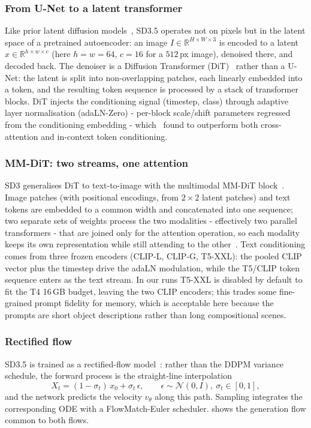 \documentclass[11pt,a4paper]{article}
\begin{document}
\subsubsection*{From U-Net to a latent transformer}
Like prior latent diffusion models~\cite{sdxl}, SD3.5 operates not on pixels but
in the latent space of a pretrained autoencoder: an image
$I\in\mathbb{R}^{H\times W\times 3}$ is encoded to a latent
$x\in\mathbb{R}^{h\times w\times c}$ (here $h=w=64$, $c=16$ for a $512$\,px
image), denoised there, and decoded back. The denoiser is a Diffusion
Transformer (DiT)~\cite{dit} rather than a U-Net: the latent is split into
non-overlapping patches, each linearly embedded into a token, and the resulting
token sequence is processed by a stack of transformer blocks. DiT injects the
conditioning signal (timestep, class) through adaptive layer
normalisation (adaLN-Zero) - per-block scale/shift parameters regressed from
the conditioning embedding - which~\cite{dit} found to outperform both
cross-attention and in-context token conditioning.

\subsubsection*{MM-DiT: two streams, one attention}
SD3 generalises DiT to text-to-image with the multimodal MM-DiT
block~\cite{sd3}. Image patches (with positional encodings, from $2\times2$
latent patches) and text tokens are embedded to a common width and concatenated
into one sequence; two separate sets of weights process the two
modalities - effectively two parallel transformers - that are joined
only for the attention operation, so each modality keeps its own
representation while still attending to the other~\cite{sd3}. Text conditioning
comes from three frozen encoders (CLIP-L, CLIP-G, T5-XXL): the pooled CLIP
vector plus the timestep drive the adaLN modulation, while the T5/CLIP token
sequence enters as the text stream. In our runs T5-XXL is disabled by default to
fit the T4 16\,GB budget, leaving the two CLIP encoders; this trades some
fine-grained prompt fidelity for memory, which is acceptable here because the
prompts are short object descriptions rather than long compositional scenes.

\subsubsection*{Rectified flow}
SD3.5 is trained as a rectified-flow model~\cite{sd3}: rather than the
DDPM variance schedule, the forward process is the straight-line interpolation
\begin{equation}\label{eq:rf}
  X_t = (1-\sigma_t)\,x_0 + \sigma_t\,\epsilon,
  \qquad \epsilon\sim\mathcal{N}(0,I),\ \sigma_t\in[0,1],
\end{equation}
and the network predicts the velocity $v_\theta$ along this path. Sampling
integrates the corresponding ODE with a FlowMatch-Euler scheduler.
 shows the generation flow common to both flows.
\end{document}
